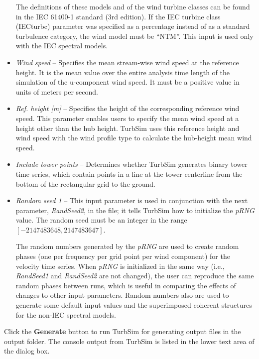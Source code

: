 \begin{itemize}
  The definitions of these models and of the wind turbine classes can be found
  in the IEC 61400-1 standard (3rd edition).
  If the IEC turbine class (IECturbc) parameter was specified as a percentage
  instead of as a standard turbulence category, the wind model must be ``NTM''.
  This input is used only with the IEC spectral models.

\item{\sl Wind speed} --
  Specifies the mean stream-wise wind speed at the reference height.
  It is the mean value over the entire analysis time length of the simulation
  of the u-component wind speed.
  It must be a positive value in units of meters per second.
\item{\sl Ref. height [m]} --
  Specifies the height of the corresponding reference wind speed.
  This parameter enables users to specify the mean wind speed at a height other
  than the hub height. TurbSim uses this reference height and wind speed
  with the wind profile type to calculate the hub-height mean wind speed.
\item{\sl Include tower points} --
  Determines whether TurbSim generates binary tower time series,
  which contain points in a line at the tower centerline from the bottom
  of the rectangular grid to the ground.
\item{\sl Random seed 1} --
  This input parameter is used in conjunction with the next parameter,
  {\sl RandSeed2}, in the  file; it tells TurbSim how to initialize
  the {\sl pRNG} value. The random seed must be an integer in the range
  $[-2147483648,2147483647]$.

  The random numbers generated by the {\sl pRNG} are used to create random
  phases (one per frequency per grid point per wind component) for the velocity
  time series. When {\sl pRNG} is initialized in the same way
  (i.e., {\sl RandSeed1} and {\sl RandSeed2} are not changed),
  the user can reproduce the same random phases between runs,
  which is useful in comparing the effects of changes to other input parameters.
  Random numbers also are used to generate some default input values and the
  superimposed coherent structures for the non-IEC spectral models.
\end{itemize}

Click the \textbf{Generate} button to run TurbSim for generating output files
in the output folder. The console output from TurbSim is listed in
the lower text area of the dialog box.



